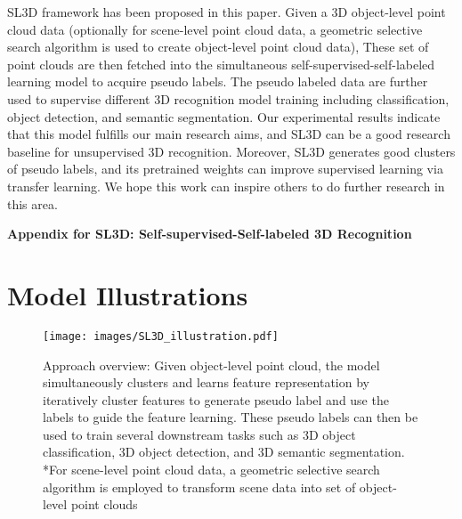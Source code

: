 \documentclass{article}
\begin{document}
SL3D framework has been proposed in this paper. Given a 3D object-level point cloud data (optionally for scene-level point cloud data, a geometric selective search algorithm is used to create object-level point cloud data), These set of point clouds are then fetched into the simultaneous self-supervised-self-labeled learning model to acquire pseudo labels. 
The pseudo labeled data are further used to supervise different 3D recognition model training including classification, object detection, and semantic segmentation. Our experimental results indicate that this model fulfills our main research aims, and SL3D can be a good research baseline for unsupervised 3D recognition.
Moreover, SL3D generates good clusters of pseudo labels, and its pretrained weights can improve supervised learning via transfer learning. We hope this work can inspire others to do further research in this area.

































\newpage

\large 
\begin{center}
    \textbf{Appendix for SL3D: Self-supervised-Self-labeled 3D Recognition} \
\end{center} 
\appendix


\section{Model Illustrations}
\label{sec:illustration}
\begin{figure*}[!ht]
\texttt{[image: images/SL3D\_illustration.pdf]}
\caption{Approach overview: Given object-level point cloud, the model simultaneously clusters and learns feature representation by iteratively cluster features to generate pseudo label and use the labels to guide the feature learning. These pseudo labels can then be used to train several downstream tasks such as 3D object classification, 3D object detection, and 3D semantic segmentation. *For scene-level point cloud data, a geometric selective search algorithm \cite{ren2021wypr} is employed to transform scene data into set of object-level point clouds}\label{fig:1} 
\end{figure*}
\end{document}
